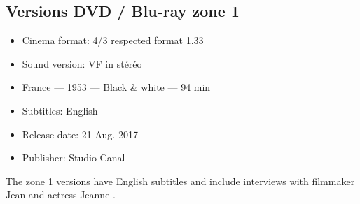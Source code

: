 \subsection*{Versions DVD / Blu-ray zone 1}

\begin{itemize}
	\item Cinema format: 4/3 respected format 1.33
	\item Sound version: VF in stéréo
	\item France --- 1953 --- Black \& white --- 94 min
	\item Subtitles: English
	\item Release date: 21 Aug. 2017
	\item Publisher: Studio Canal
\end{itemize}

The zone 1 versions have English subtitles and include interviews with filmmaker Jean  and actress Jeanne .

